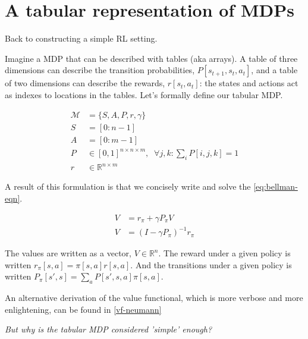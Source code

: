 \section{A tabular representation of MDPs}

Back to constructing a simple RL setting.

Imagine a MDP that can be described with tables (aka arrays). A table of
three dimensions can describe the transition probabilities, $P[s_{t+1}, s_t, a_t]$,
and a table of two dimensions can describe the rewards, $r[s_t, a_t]$: the
states and actions act as indexes to locations in the tables.
Let's formally define our tabular MDP.

\begin{align}
\mathcal M &= \{S, A, P, r, \gamma\}\; \tag{the MDP}\\
S &= [0:n-1] \tag{the state space}\\
A &= [0:m-1] \tag{the action space}\\
P &\in [0,1]^{n\times n \times m}, \;\;\forall j, k : \sum_i P[i, j, k] = 1 \tag{the transition fn}\\
r &\in \mathbb R^{n\times m} \tag{the reward fn}
\end{align}

A result of this formulation is that we concisely write and solve the \eqref{eq:bellman-eqn}. \footnotemark[0]


\begin{align}
V &= r_{\pi} + \gamma P_{\pi} V \tag{tabular Bellman eqn}\\
V &= (I-\gamma P_{\pi})^{-1}r_{\pi}  \label{eq:value-functional}\tag{Value functional}
\end{align}

The values are written as a vector, $V \in \mathbb R^n$.
The reward under a given policy is written $r_{\pi}[s, a] = \pi[s, a] r[s, a]$.
And the transitions under a given policy is written $P_{\pi}[s', s] = \sum_a P[s', s, a]\pi[s, a]$.

An alternative derivation of the value functional, which is more verbose and more enlightening, can be found in \ref{vf-neumann}

\begin{displayquote}
\textit{But why is the tabular MDP considered 'simple' enough?}
\end{displayquote}

